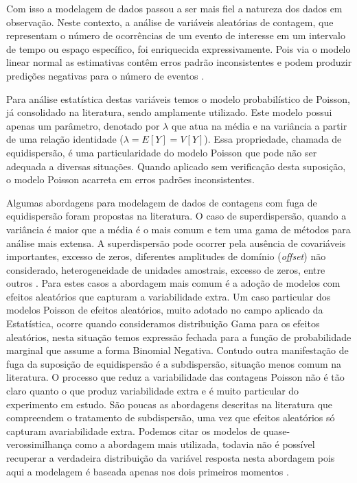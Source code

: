 \documentclass[
12pt,				%
openright,			%
oneside,			%
a4paper,			%
english,			%
brazil,				%
]{abntex2}
\begin{document}
Com isso a modelagem de dados passou a ser mais
fiel a natureza dos dados em observação. Neste contexto, a análise de
variáveis aleatórias de contagem, que representam o número de
ocorrências de um evento de interesse em um intervalo de tempo ou espaço
específico, foi enriquecida expressivamente. Pois via o modelo
linear normal as estimativas contêm erros padrão inconsistentes e podem
produzir predições negativas para o número de eventos
\cite{King1989}. 

Para análise estatística destas variáveis temos o modelo probabilístico
de Poisson, já consolidado na literatura, sendo amplamente
utilizado. Este modelo possui apenas um parâmetro, denotado por
$\lambda$ que atua na média e na variância a partir de uma relação
identidade ($\lambda = E[Y] = V[Y]$). Essa propriedade, chamada de
equidispersão, é uma particularidade do modelo Poisson que pode não ser
adequada a diversas situações. Quando aplicado sem verificação desta
suposição, o modelo Poisson acarreta em erros padrões inconsistentes.

Algumas abordagens para modelagem de dados de contagens com fuga de
equidispersão foram propostas na literatura. O caso de superdispersão,
quando a variância é maior que a média é o mais comum e tem uma gama de
métodos para análise mais extensa. A superdispersão pode ocorrer pela
ausência de covariáveis importantes, excesso de zeros, diferentes
amplitudes de domínio (\textit{offset}) não considerado, heterogeneidade
de unidades amostrais, excesso de zeros, entre
outros \cite{RibeiroJr2012}. Para estes casos a abordagem mais comum é a
adoção de modelos com efeitos aleatórios que capturam a variabilidade
extra. Um caso particular dos modelos Poisson de efeitos aleatórios,
muito adotado no campo aplicado da Estatística, ocorre quando
consideramos distribuição Gama para os efeitos aleatórios, nesta
situação temos expressão fechada para a função de probabilidade marginal
que assume a forma Binomial Negativa. Contudo outra manifestação de
fuga da suposição de equidispersão é a subdispersão, situação menos
comum na literatura. O processo
que reduz a variabilidade das contagens Poisson não é tão claro quanto o
que produz variabilidade extra e é muito particular do experimento em
estudo. São poucas as abordagens descritas na literatura  que
compreendem o tratamento de
subdispersão, uma vez que efeitos aleatórios só capturam avariabilidade
extra. Podemos citar os modelos de quase-verossimilhança como a 
abordagem mais utilizada, todavia não é possível recuperar a verdadeira
distribuição da variável resposta nesta abordagem pois aqui a
modelagem é baseada apenas nos dois primeiros momentos \cite{Paula2013}. 
\end{document}
